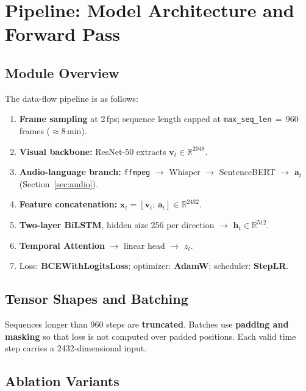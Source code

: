\documentclass[10pt,conference]{IEEEtran}
\begin{document}
\section{Pipeline: Model Architecture and Forward Pass}
\label{sec:pipeline}

\subsection{Module Overview}

The data-flow pipeline is as follows:
\begin{enumerate}
  \item \textbf{Frame sampling} at 2\,fps; sequence length capped at
        \texttt{max\_seq\_len}$\,{=}\,960$ frames ($\approx$8\,min).
  \item \textbf{Visual backbone:} ResNet-50 extracts
        $\mathbf{v}_t \in \mathbb{R}^{2048}$.
  \item \textbf{Audio-language branch:} \texttt{ffmpeg} $\to$ Whisper $\to$
        SentenceBERT $\to$ $\mathbf{a}_t$ (Section~\ref{sec:audio}).
  \item \textbf{Feature concatenation:}
        $\mathbf{x}_t = [\mathbf{v}_t;\, \mathbf{a}_t] \in \mathbb{R}^{2432}$.
  \item \textbf{Two-layer BiLSTM}, hidden size 256 per direction
        $\to$ $\mathbf{h}_t \in \mathbb{R}^{512}$.
  \item \textbf{Temporal Attention} $\to$ linear head $\to$ $z_t$.
  \item Loss: \textbf{BCEWithLogitsLoss}; optimizer: \textbf{AdamW};
        scheduler: \textbf{StepLR}.
\end{enumerate}

\subsection{Tensor Shapes and Batching}

Sequences longer than 960 steps are \textbf{truncated}. Batches use
\textbf{padding and masking} so that loss is not computed over padded
positions. Each valid time step carries a 2432-dimensional input.

\subsection{Ablation Variants}
\end{document}
